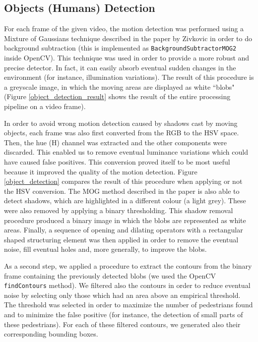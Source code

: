 \documentclass[runningheads]{llncs}
\begin{document}
\subsection{Objects (Humans) Detection}
For each frame of the given video, the motion detection was performed using a Mixture of Gaussians technique described in the paper by Zivkovic \cite{Mog} in order to do background subtraction (this is implemented as \texttt{BackgroundSubtractorMOG2}\cite{backgroundsubtractormog} inside OpenCV). This technique was used in order to provide a more robust and precise detector. In fact, it can easily absorb eventual sudden changes in the environment (for instance, illumination variations). The result of this procedure is a greyscale image, in which the moving areas are displayed as white ``blobs" (Figure \ref{object_detection_result} shows the result of the entire processing pipeline on a video frame).
\smallskip

In order to avoid wrong motion detection caused by shadows cast by moving objects, each frame was also first converted from the RGB to the HSV space. Then, the hue (H) channel was extracted and the other components were discarded. This enabled us to remove eventual luminance variations which could have caused false positives.
This conversion proved itself to be most useful because it improved the quality of the motion detection. Figure \ref{object_detection} compares the result of this procedure when applying or not the HSV conversion.
The MOG method described in the paper is also able to detect shadows, which are highlighted in a different colour (a light grey). These were also removed by applying a binary thresholding. This shadow removal procedure produced a binary image in which the blobs are represented as white areas. 
Finally,  a sequence of opening and dilating operators with a rectangular shaped structuring element was then applied in order to remove the eventual noise, fill eventual holes and, more generally, to improve the blobs.
\smallskip

As a second step, we applied a procedure to extract the contours from the binary frame containing the previously detected blobs (we used the OpenCV \texttt{findContours} \cite{findcontours} method). We filtered also the contours in order to reduce eventual noise by selecting only those which had an area above an empirical threshold. The threshold was selected in order to maximize the number of pedestrians found and to minimize the false positive (for instance, the detection of small parts of these pedestrians).  For each of these filtered contours, we generated also their corresponding bounding boxes.
\end{document}
